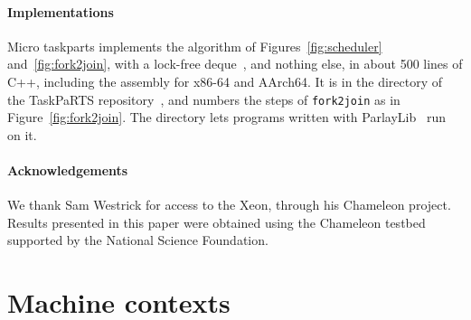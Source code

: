 \documentclass[sigplan,nonacm]{acmart}
\begin{document}
\paragraph{Implementations}
%
Micro taskparts implements the algorithm of
Figures~\ref{fig:scheduler} and~\ref{fig:fork2join}, with a lock-free
deque~\cite{arora98}, and nothing else, in about 500 lines of C++,
including the assembly for x86-64 and AArch64.
%
It is in the directory  of
the TaskPaRTS repository~\cite{taskparts}, and numbers the steps of
\lstinline|fork2join| as in Figure~\ref{fig:fork2join}.
%
The directory  lets programs written with
ParlayLib~\cite{blelloch20parlaylib} run on it.

\paragraph{Acknowledgements}
%
We thank Sam Westrick for access to the Xeon, through his Chameleon
project.
%
Results presented in this paper were obtained using the Chameleon
testbed~\cite{keahey2020lessons} supported by the National Science
Foundation.




\clearpage
\appendix

\section{Machine contexts}
\label{sec:contexts}
\end{document}
